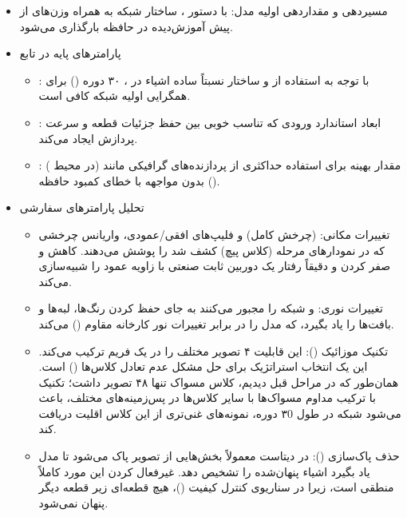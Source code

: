 \documentclass{article}
\begin{document}
\begin{itemize}
	
	\item مسیردهی و مقداردهی اولیه مدل: با دستور ، ساختار شبکه به همراه وزن‌های از پیش آموزش‌دیده در حافظه بارگذاری می‌شود.
	
	\item پارامترهای پایه در تابع 
	\begin{itemize}
		\item {}: با توجه به استفاده از  و ساختار نسبتاً ساده اشیاء در ، ۳۰ دوره () برای همگرایی اولیه شبکه کافی است.
		\item {}: ابعاد استاندارد ورودی  که تناسب خوبی بین حفظ جزئیات قطعه و سرعت پردازش ایجاد می‌کند.
		\item {}: مقدار بهینه برای استفاده حداکثری از  پردازنده‌های گرافیکی مانند  (در محیط ) بدون مواجهه با خطای کمبود حافظه ().
	\end{itemize}
	
	\item تحلیل پارامترهای سفارشی 
	\begin{itemize}
		\item تغییرات مکانی:  (چرخش کامل) و فلیپ‌های افقی/عمودی، واریانس چرخشی که در نمودارهای مرحله  (کلاس پیچ) کشف شد را پوشش می‌دهند. کاهش  و صفر کردن  و  دقیقاً رفتار یک دوربین ثابت صنعتی با زاویه عمود را شبیه‌سازی می‌کند.
		\item تغییرات نوری:  و  شبکه را مجبور می‌کنند به جای حفظ کردن رنگ‌ها، لبه‌ها و بافت‌ها را یاد بگیرد، که مدل را در برابر تغییرات نور کارخانه مقاوم () می‌کند.
		\item تکنیک موزائیک (): این قابلیت ۴ تصویر مختلف را در یک فریم ترکیب می‌کند. این یک انتخاب استراتژیک برای حل مشکل عدم تعادل کلاس‌ها () است. همان‌طور که در مراحل قبل دیدیم، کلاس مسواک تنها ۴۸ تصویر داشت؛ تکنیک  با ترکیب مداوم مسواک‌ها با سایر کلاس‌ها در پس‌زمینه‌های مختلف، باعث می‌شود شبکه در طول ۳0 دوره، نمونه‌های غنی‌تری از این کلاس اقلیت دریافت کند.
		\item حذف پاک‌سازی (): در دیتاست  معمولاً بخش‌هایی از تصویر پاک می‌شود تا مدل یاد بگیرد اشیاء پنهان‌شده را تشخیص دهد. غیرفعال کردن این مورد کاملاً منطقی است، زیرا در سناریوی کنترل کیفیت ()، هیچ قطعه‌ای زیر قطعه دیگر پنهان نمی‌شود.
	\end{itemize}
\end{itemize}
\end{document}
